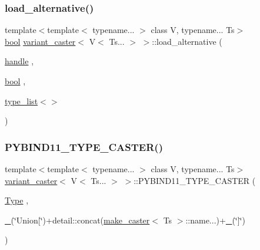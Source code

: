 \mbox{\label{structvariant__caster_3_01_v_3_01_ts_8_8_8_01_4_01_4_a6a1767174a525e0ce1b7adf4c7ee2cbb}} 
\subsubsection{\texorpdfstring{load\_alternative()}{load\_alternative()}\hspace{0.1cm}{\footnotesize\ttfamily [2/2]}}
{\footnotesize\ttfamily template$<$template$<$ typename... $>$ class V, typename... Ts$>$ \\
\mbox{\hyperlink{asdl_8h_af6a258d8f3ee5206d682d799316314b1}{bool}} \mbox{\hyperlink{structvariant__caster}{variant\+\_\+caster}}$<$ V$<$ Ts... $>$ $>$\+::load\+\_\+alternative (\begin{DoxyParamCaption}\item[{\mbox{\hyperlink{classhandle}{handle}}}]{,  }\item[{\mbox{\hyperlink{asdl_8h_af6a258d8f3ee5206d682d799316314b1}{bool}}}]{,  }\item[{\mbox{\hyperlink{structtype__list}{type\+\_\+list}}$<$$>$}]{ }\end{DoxyParamCaption})\hspace{0.3cm}{\ttfamily [inline]}}

\mbox{\label{structvariant__caster_3_01_v_3_01_ts_8_8_8_01_4_01_4_a3adec4059b0a4ff86b350c02541fcfff}} 
\subsubsection{\texorpdfstring{PYBIND11\_TYPE\_CASTER()}{PYBIND11\_TYPE\_CASTER()}}
{\footnotesize\ttfamily template$<$template$<$ typename... $>$ class V, typename... Ts$>$ \\
\mbox{\hyperlink{structvariant__caster}{variant\+\_\+caster}}$<$ V$<$ Ts... $>$ $>$\+::P\+Y\+B\+I\+N\+D11\+\_\+\+T\+Y\+P\+E\+\_\+\+C\+A\+S\+T\+ER (\begin{DoxyParamCaption}\item[{\mbox{\hyperlink{structvariant__caster_3_01_v_3_01_ts_8_8_8_01_4_01_4_af19893dac45401bbb67d1adfd284d463}{Type}}}]{,  }\item[{\mbox{\hyperlink{descr_8h_af114703e20c6527e87163eb2798f74b8}{\+\_\+}}(\char`\"{}Union\mbox{[}\char`\"{})+detail\+::concat(\mbox{\hyperlink{cast_8h_ab32b52411a6b07420516d79074815713}{make\+\_\+caster}}$<$ Ts $>$\+::name...)+\mbox{\hyperlink{descr_8h_af114703e20c6527e87163eb2798f74b8}{\+\_\+}}(\char`\"{}\mbox{]}\char`\"{})}]{ }\end{DoxyParamCaption})}



